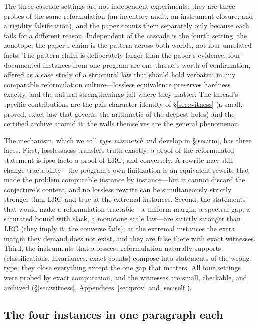 The three cascade settings are not independent experiments: they are three
probes of the same reformulation (an inventory audit, an instrument
closure, and a rigidity falsification), and the paper counts them
separately only because each fails for a different reason. Independent of
the cascade is the fourth setting, the zonotope; the paper's claim is the
pattern across both worlds, not four unrelated facts. The pattern claim
is deliberately larger than the paper's evidence: four documented
instances from one program are one thread's worth of confirmation,
offered as a case study of a structural law that should hold verbatim in
any comparable reformulation culture---lossless equivalence preserves
hardness exactly, and the natural strengthenings fail where they matter.
The thread's specific contributions are the pair-character identity of
\S\ref{sec:witness} (a small, proved, exact law that governs the
arithmetic of the deepest holes) and the certified archive around it;
the walls themselves are the general phenomenon.

The mechanism, which we call \emph{type mismatch} and develop in
\S\ref{sec:tm}, has three faces. First, losslessness transfers truth
exactly: a proof of the reformulated statement is ipso facto a proof of
$\mathrm{LRC}$, and conversely. A rewrite may still change tractability---the
program's own finitization is an equivalent rewrite that made the problem
computable instance by instance---but it cannot discard the conjecture's
content, and no lossless rewrite can be simultaneously strictly stronger
than $\mathrm{LRC}$ and true at the extremal instances. Second, the statements
that would make a reformulation tractable---a uniform margin, a spectral
gap, a saturated bound with slack, a monotone scale law---are strictly
stronger than $\mathrm{LRC}$ (they imply it; the converse fails); at the extremal
instances the extra margin they demand does not exist, and they are false
there with exact witnesses. Third, the instruments that a lossless
reformulation naturally supports (classifications, invariances, exact
counts) compose into statements of the wrong type: they close everything
except the one gap that matters. All four settings were probed by exact
computation, and the witnesses are small, checkable, and archived
(\S\ref{sec:witness}, Appendices~\ref{sec:prov} and \ref{sec:self}).

\subsection{The four instances in one paragraph each}

